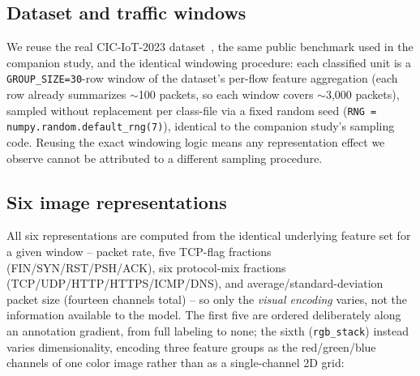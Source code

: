 \documentclass[11pt]{article}
\begin{document}
\subsection{Dataset and traffic windows}

We reuse the real CIC-IoT-2023 dataset~\cite{cic-iot-2023}, the same public benchmark used in the
companion study, and the identical windowing procedure: each classified unit is a
\texttt{GROUP\_SIZE=30}-row window of the dataset's per-flow feature aggregation (each row already
summarizes $\sim$100 packets, so each window covers $\sim$3,000 packets), sampled without
replacement per class-file via a fixed random seed (\texttt{RNG = numpy.random.default\_rng(7)}),
identical to the companion study's sampling code. Reusing the exact windowing logic means any
representation effect we observe cannot be attributed to a different sampling procedure.

\subsection{Six image representations}
\label{sec:representations}

All six representations are computed from the identical underlying feature set for a given window
-- packet rate, five TCP-flag fractions (FIN/SYN/RST/PSH/ACK), six protocol-mix fractions
(TCP/UDP/HTTP/HTTPS/ICMP/DNS), and average/standard-deviation packet size (fourteen channels total)
-- so only the \emph{visual encoding} varies, not the information available to the model. The first
five are ordered deliberately along an annotation gradient, from full labeling to none; the sixth
(\texttt{rgb\_stack}) instead varies dimensionality, encoding three feature groups as the
red/green/blue channels of one color image rather than as a single-channel 2D grid:
\end{document}
